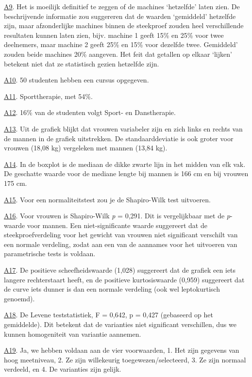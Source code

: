 \documentclass[
  letterpaper,
  DIV=11,
  numbers=noendperiod]{scrartcl}
\begin{document}
\begin{tcolorbox}[beforeafter skip=1cm, ignore nobreak=true, breakable, colframe=Questions-frame, colback=Questions-bg, coltext=Questions-text, boxsep=2mm, arc=0mm, boxrule=0.5mm]
\protect\hypertarget{A9}{\protect\hyperlink{Q9}{A9}}. Het is moeilijk
definitief te zeggen of de machines `hetzelfde' laten zien. De
beschrijvende informatie zou suggereren dat de waarden `gemiddeld'
hetzelfde zijn, maar afzonderlijke machines binnen de steekproef zouden
heel verschillende resultaten kunnen laten zien, bijv. machine 1 geeft
15\% en 25\% voor twee deelnemers, maar machine 2 geeft 25\% en 15\%
voor dezelfde twee. Gemiddeld' zouden beide machines 20\% aangeven. Het
feit dat getallen op elkaar `lijken' betekent niet dat ze statistisch
gezien hetzelfde zijn.

\protect\hypertarget{A10}{\protect\hyperlink{Q10}{A10}}. 50 studenten
hebben een cursus opgegeven.

\protect\hypertarget{A11}{\protect\hyperlink{Q11}{A11}}. Sporttherapie,
met 54\%.

\protect\hypertarget{A12}{\protect\hyperlink{Q12}{A12}}. 16\% van de
studenten volgt Sport- en Danstherapie.

\protect\hypertarget{A13}{\protect\hyperlink{Q13}{A13}}. Uit de grafiek
blijkt dat vrouwen variabeler zijn en zich links en rechts van de mannen
in de grafiek uitstrekken. De standaarddeviatie is ook groter voor
vrouwen (18,08 kg) vergeleken met mannen (13,84 kg).

\protect\hypertarget{A14}{\protect\hyperlink{Q14}{A14}}. In de boxplot
is de mediaan de dikke zwarte lijn in het midden van elk vak. De
geschatte waarde voor de mediane lengte bij mannen is 166 cm en bij
vrouwen 175 cm.

\protect\hypertarget{A15}{\protect\hyperlink{Q15}{A15}}. Voor een
normaliteitstest zou je de Shapiro-Wilk test uitvoeren.

\protect\hypertarget{A16}{\protect\hyperlink{Q16}{A16}}. Voor vrouwen is
Shapiro-Wilk \emph{p} = 0,291. Dit is vergelijkbaar met de
\emph{p}-waarde voor mannen. Een niet-significante waarde suggereert dat
de steekproefverdeling voor het gewicht van vrouwen niet significant
verschilt van een normale verdeling, zodat aan een van de aannames voor
het uitvoeren van parametrische tests is voldaan.

\protect\hypertarget{A17}{\protect\hyperlink{Q17}{A17}}. De positieve
scheefheidswaarde (1,028) suggereert dat de grafiek een iets langere
rechterstaart heeft, en de positieve kurtosiswaarde (0,959) suggereert
dat de curve iets dunner is dan een normale verdeling (ook wel
leptokurtisch genoemd).

\protect\hypertarget{A18}{\protect\hyperlink{Q18}{A18}}. De Levene
teststatistiek, F = 0,642, p = 0,427 (gebaseerd op het gemiddelde). Dit
betekent dat de varianties niet significant verschillen, dus we kunnen
homogeniteit van variantie aannemen.

\protect\hypertarget{A19}{\protect\hyperlink{Q19}{A19}}. Ja, we hebben
voldaan aan de vier voorwaarden, 1. Het zijn gegevens van hoog
meetniveau, 2. Ze zijn willekeurig toegewezen/selecteerd, 3. Ze zijn
normaal verdeeld, en 4. De varianties zijn gelijk.

\end{tcolorbox}
\end{document}
